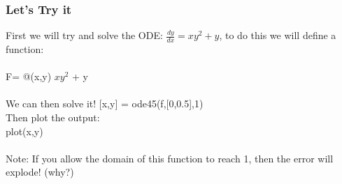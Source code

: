 \documentclass{beamer}
\begin{document}
\begin{frame}
\frametitle{Let's Try it} 

First we will try and solve the ODE: $\frac{dy}{dx} = xy^2 + y$, to do this we will define a function:\\
\ \\
F= @(x,y) $xy^2$ + y \\
\ \\
We can then solve it! [x,y] = ode45(f,[0,0.5],1)\\
Then plot the output: \\
plot(x,y)\\
\ \\
Note: If you allow the domain of this function to reach 1, then the error will explode! (why?)
\end{frame}
\end{document}
